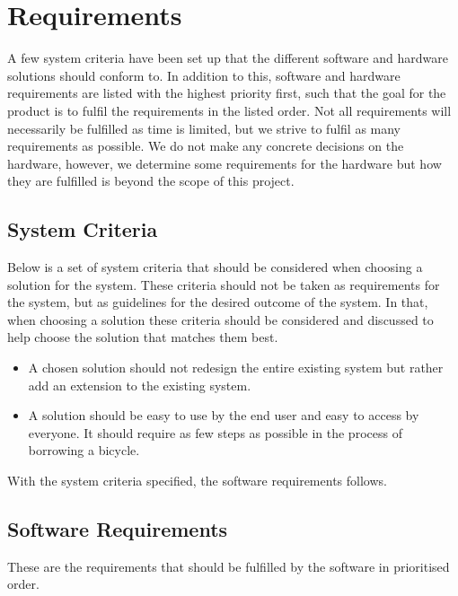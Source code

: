 \section{Requirements}
A few system criteria have been set up that the different software and hardware solutions should conform to. 
In addition to this, software and hardware requirements are listed with the highest priority first, such that the goal for the product is to fulfil the requirements in the listed order. 
Not all requirements will necessarily be fulfilled as time is limited, but we strive to fulfil as many requirements as possible.
We do not make any concrete decisions on the hardware, however, we determine some requirements for the hardware but how they are fulfilled is beyond the scope of this project.

\subsection{System Criteria}\label{sec:systemCriteria}
Below is a set of system criteria that should be considered when choosing a solution for the system.
These criteria should not be taken as requirements for the system, but as guidelines for the desired outcome of the system.
In that, when choosing a solution these criteria should be considered and discussed to help choose the solution that matches them best.

\begin{itemize}
	\item A chosen solution should not redesign the entire existing system but rather add an extension to the existing system.
	\item A solution should be easy to use by the end user and easy to access by everyone. 
	It should require as few steps as possible in the process of borrowing a bicycle.
\end{itemize}

With the system criteria specified, the software requirements follows.

\subsection{Software Requirements}
These are the requirements that should be fulfilled by the software in prioritised order.


